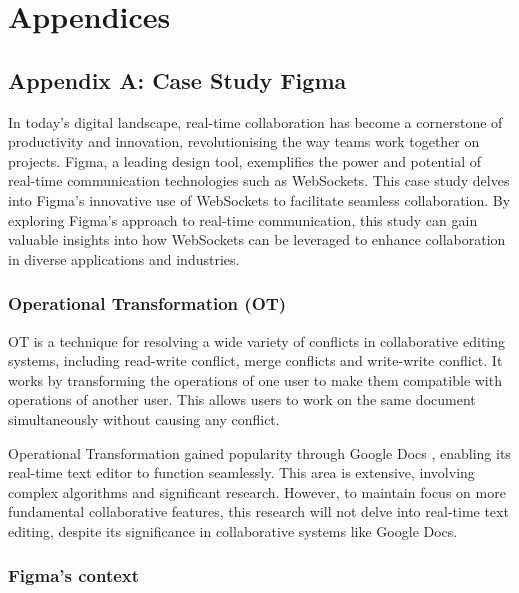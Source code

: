 \newpage

\section*{Appendices}

\subsection*{Appendix A: Case Study Figma}

In today's digital landscape, real-time collaboration has become a cornerstone of productivity and innovation, revolutionising the way teams work together on projects. Figma, a leading design tool, exemplifies the power and potential of real-time communication technologies such as WebSockets. This case study delves into Figma's innovative use of WebSockets to facilitate seamless collaboration. By exploring Figma's approach to real-time communication, this study can gain valuable insights into how WebSockets can be leveraged to enhance collaboration in diverse applications and industries.

\subsubsection*{Operational Transformation (OT)}

OT is a technique for resolving a wide variety of conflicts in collaborative editing systems, including read-write conflict, merge conflicts and write-write conflict. It works by transforming the operations of one user to make them compatible with operations of another user. This allows users to work on the same document simultaneously without causing any conflict. \cite{ot}

Operational Transformation gained popularity through Google Docs \cite{figma-rtc}, enabling its real-time text editor to function seamlessly. This area is extensive, involving complex algorithms and significant research. However, to maintain focus on more fundamental collaborative features, this research will not delve into real-time text editing, despite its significance in collaborative systems like Google Docs.

\subsubsection*{Figma's context}

